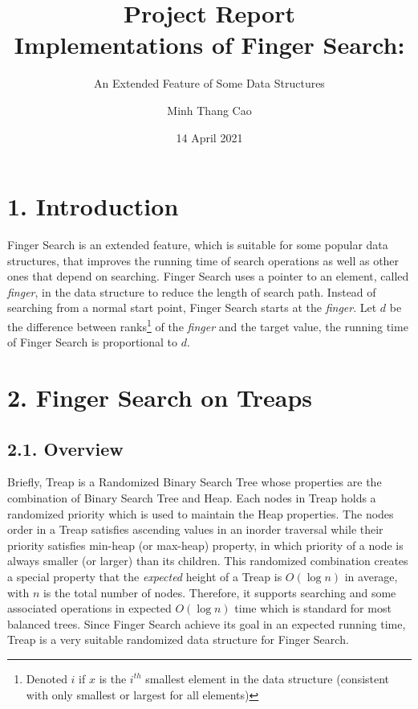 \documentclass[12pt,english,]{article}
\title{\textbf{Project Report}\\
\Large{Implementations of Finger Search:}}
\subtitle{An Extended Feature of Some Data Structures}
\author{Minh Thang Cao}
\date{14 April 2021}
\begin{document}
\maketitle

\graphicspath{ {./} }

\hypertarget{section1}{%
\section{\texorpdfstring{1.
\enspace Introduction}{1. Introduction}}\label{section1}}

Finger Search is an extended feature, which is suitable for some popular
data structures, that improves the running time of search operations as
well as other ones that depend on searching. Finger Search uses a
pointer to an element, called \emph{finger}, in the data structure to
reduce the length of search path. Instead of searching from a normal
start point, Finger Search starts at the \emph{finger}. Let \(d\) be the
difference between ranks\footnote{Denoted \(i\) if \(x\) is the
  \(i^{th}\) smallest element in the data structure (consistent with
  only smallest or largest for all elements)} of the \emph{finger} and
the target value, the running time of Finger Search is proportional to
\(d\).

\hypertarget{section2}{%
\section{\texorpdfstring{2. \enspace Finger Search on
Treaps}{2. Finger Search on Treaps}}\label{section2}}

\hypertarget{overview}{%
\subsection{2.1. Overview}\label{overview}}

Briefly, Treap is a Randomized Binary Search Tree whose properties are
the combination of Binary Search Tree and Heap. Each nodes in Treap
holds a randomized priority which is used to maintain the Heap
properties. The nodes order in a Treap satisfies ascending values in an
inorder traversal while their priority satisfies min-heap (or max-heap)
property, in which priority of a node is always smaller (or larger) than
its children. This randomized combination creates a special property
that the \emph{expected} height of a Treap is \(O(\log n)\) in average,
with \(n\) is the total number of nodes. Therefore, it supports
searching and some associated operations in expected \(O(\log n)\) time
which is standard for most balanced trees. Since Finger Search achieve
its goal in an expected running time, Treap is a very suitable
randomized data structure for Finger Search.
\end{document}
